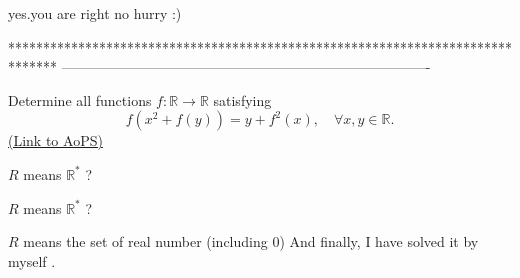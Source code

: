 \begin{solution}
	yes.you are right no hurry :)
\end{solution}
*******************************************************************************
-------------------------------------------------------------------------------

\begin{problem}
	Determine all functions $f: \mathbb R \to \mathbb R$ satisfying
\[ f(x^2 + f(y)) = y + f^2(x), \quad \forall x,y \in \mathbb R.\]
	\flushright \href{https://artofproblemsolving.com/community/c6h316533}{(Link to AoPS)}
\end{problem}



\begin{solution}
	$ R$ means $ \mathbb{R^{*}}$ ?
\end{solution}



\begin{solution}
	\begin{tcolorbox}$ R$ means $ \mathbb{R^{*}}$ ?\end{tcolorbox}

$ R$ means the set of real number (including 0)
And finally, I have solved it by myself  .
\end{solution}




